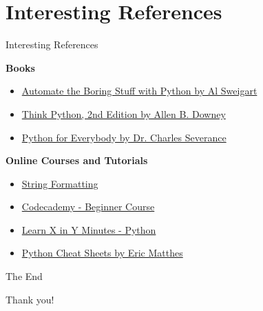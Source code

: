 \documentclass[
	11pt, 
]{beamer}
\begin{document}

\section{Interesting References}
\begin{frame}[fragile]{Interesting References}
\begin{exampleblock}{\textbf{Books}}
    
\begin{itemize}


\item \href{https://automatetheboringstuff.com/}{Automate the Boring Stuff with Python by Al Sweigart}

\item \href{http://greenteapress.com/thinkpython2/thinkpython2.pdf}{Think Python, 2nd Edition by Allen B. Downey}

\item \href{https://www.py4e.com/book.php}{Python for Everybody by Dr. Charles Severance}

\end{itemize}
\end{exampleblock}

\begin{exampleblock}{\textbf{Online Courses and Tutorials}}

\begin{itemize}

\item \href{https://mkaz.blog/working-with-python/string-formatting/}{String Formatting}

\item \href{https://www.codecademy.com/learn/learn-python-3}{Codecademy - Beginner Course}

\item \href{https://learnxinyminutes.com/docs/python/}{Learn X in Y Minutes - Python}

\item \href{https://ehmatthes.github.io/pcc_2e/cheat_sheets/cheat_sheets/}{Python Cheat Sheets by Eric Matthes}
\end{itemize}
\end{exampleblock}
\end{frame}



\begin{frame}[fragile]{The End}

\centering

\Huge Thank you!

\end{frame}
\end{document}
